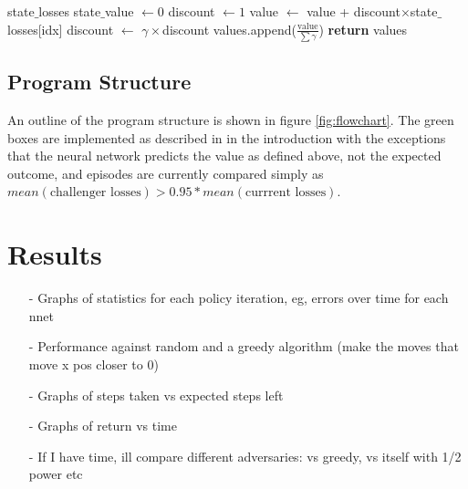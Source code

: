 \documentclass[12pt]{article}
\begin{document}
\begin{algorithm}[h]
\caption{Calculate State Values}
\label{alg:values}
\begin{algorithmic}[1]
    {state$\_$losses}
      \State state$\_$value $\gets 0$ 
      \State discount $\gets 1$
         \State value $\gets$ value + discount$\times$state$\_$losses[idx]
         \State discount $\gets$ $\gamma \times $discount
      \EndFor
      \State values.append($\frac{\text{value}}{\sum \gamma}$)
   \EndFor
   \State \textbf{return} values 
   \EndProcedure
\end{algorithmic}
\end{algorithm}

\subsection{Program Structure}

An outline of the program structure is shown in figure \ref{fig:flowchart}. The green boxes are implemented as described in \cite{AlphaGoZero} in the introduction with the exceptions that the neural network predicts the value as defined above, not the expected outcome, and episodes are currently compared simply as $mean(\text{challenger losses}) > 0.95*mean(\text{currrent losses})$.

\section{Results}
\begin{itemize}
   \item[-] Graphs of statistics for each policy iteration, eg, errors over time for each nnet
   \item[-] Performance against random and a greedy algorithm (make the moves that move x pos closer to 0)
   \item[-] Graphs of steps taken vs expected steps left
   \item[-] Graphs of return vs time
   \item[-] If I have time, ill compare different adversaries: vs greedy, vs itself with 1/2 power etc
\end{itemize}  
\end{document}
